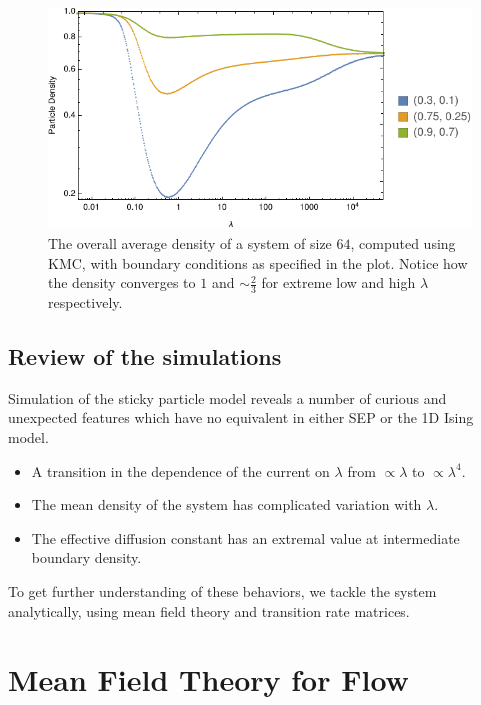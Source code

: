 \documentclass[
reprint, amsmath,amssymb,
]{revtex4-1}
\begin{document}
\begin{figure}[h!]
\vspace{0em}
\begin{center}
    \includegraphics[width=1\linewidth]{wideDensProfiles}
\end{center}
    \vspace{-0em}
\caption{\label{fig:wideDensities} The overall average density of a system of size $64$, computed using KMC, with boundary conditions as specified in the plot. Notice how the density converges to $1$ and $\sim \frac{2}{3}$
for extreme low and high $\lambda$ respectively.}
\end{figure}

\subsection{Review of the simulations}

Simulation of the sticky particle model reveals a number of curious
and unexpected features which have no equivalent in either SEP or the
1D Ising model.

\begin{itemize} \item 
A transition in the dependence of the current on $\lambda$ from $\propto \lambda$ to $\propto \lambda^4$.  
\item
The mean density of the system  has complicated variation with  $\lambda$.  
\item 
The effective diffusion constant has an extremal value at
  intermediate boundary density.
\end{itemize}

To get further understanding of these behaviors, we tackle the system
analytically, using mean field theory and transition rate matrices.

\section{Mean Field Theory for Flow} \label{sec:mftPred}
  
\end{document}

